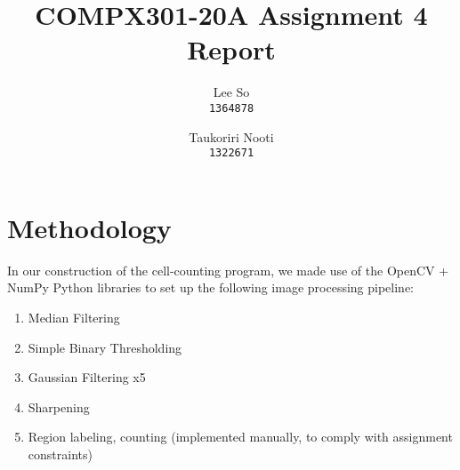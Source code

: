 \documentclass{article}
\title{COMPX301-20A Assignment 4 Report}
\author{
	Lee So\\
	\texttt{1364878}
	\and
	Taukoriri Nooti\\
	\texttt{1322671}
}
\begin{document}
	\maketitle

	\section{Methodology}
	In our construction of the cell-counting program, we made use of the OpenCV + NumPy Python libraries to set up the following image processing pipeline:

	\begin{enumerate}
		\item Median Filtering
		\item Simple Binary Thresholding
		\item Gaussian Filtering x5
		\item Sharpening
		\item Region labeling, counting (implemented manually, to comply with assignment constraints)
	\end{enumerate}
\end{document}

